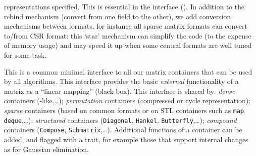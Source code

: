 		representations specified.
%
%
		This is essential in the \applin interface ().
%
		In addition to the rebind mechanism (convert from one field to the other), we add
%
	 conversion mechanisms between formats, for instance all
	 sparse matrix formats can convert to/from CSR format:  this `star'
	 mechanism can simplify the code (to the expense of memory usage) and
	 may speed it up when some central formats  are
	 well tuned for some task.
%
	 \par
%
This is a common minimal interface to all our matrix containers that can be
used by all algorithms.
This interface provides the basic {\em external}
functionality of a matrix as a
 ``linear mapping'' (black box).
This interface is shared by: \emph{dense}
containers (\blas-like,\ldots); \emph{permutation} containers (compressed
 or cycle representation); \emph{sparse} containers (based on
common formats or on STL containers such as {\tt map}, {\tt deque},\ldots);
\emph{structured} containers ({\tt Diagonal}, {\tt Hankel}, {\tt Butterfly},\ldots);
\emph{compound} containers ({\tt Compose}, {\tt Submatrix},\ldots).
Additional functions of a container can be added, and flagged with a trait, for
example those that support internal changes as for Gaussian elimination.
%
